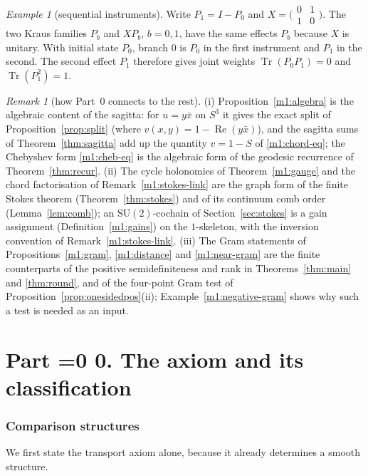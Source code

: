 \documentclass[11pt,reqno]{amsart}
\theoremstyle{definition}
\theoremstyle{remark}
\newtheorem{remark}[theorem]{Remark}
\newtheorem{example}[theorem]{Example}
\numberwithin{equation}{section}
\newcommand{\re}{\operatorname{Re}}
\newcommand{\SU}{\mathrm{SU}}
\newcounter{ppart}
\renewcommand{\theppart}{\ifnum\value{ppart}=0 0\else\Roman{ppart}\fi}
\newcommand{\paperpart}[2]{\refstepcounter{ppart}\part*{Part \theppart. #2}\label{#1}}
\begin{document}
\begin{example}[sequential instruments]\label{m1:sequential}
Write \(P_1=I-P_0\) and \(X=\bigl(\begin{smallmatrix}0&1\\1&0
\end{smallmatrix}\bigr)\). The two Kraus families \(P_b\) and
\(XP_b\), \(b=0,1\), have the same effects \(P_b\) because \(X\)
is unitary. With initial state \(P_0\), branch \(0\) is \(P_0\)
in the first instrument and \(P_1\) in the second. The second
effect \(P_1\) therefore gives joint weights
\(\operatorname{Tr}(P_0P_1)=0\) and
\(\operatorname{Tr}(P_1^2)=1\).
\end{example}

\begin{remark}[how Part~0 connects to the rest]\label{m1:links}
(i) Proposition~\ref{m1:algebra} is the algebraic content of the sagitta: for $u=y\bar x$ on $S^3$ it gives the exact split of
Proposition~\ref{prop:split} (where $v(x,y)=1-\re(y\bar x)$), and the sagitta sums of Theorem~\ref{thm:sagitta} add up the quantity $v=1-S$ of
\eqref{m1:chord-eq}; the Chebyshev form \eqref{m1:cheb-eq} is the algebraic form of the geodesic recurrence of
Theorem~\ref{thm:recur}.  (ii) The cycle holonomies of Theorem~\ref{m1:gauge} and the chord factorisation of
Remark~\ref{m1:stokes-link} are the graph form of the finite Stokes theorem (Theorem~\ref{thm:stokes}) and of its continuum comb
order (Lemma~\ref{lem:comb}); an $\SU(2)$-cochain of Section~\ref{sec:stokes} is a gain assignment (Definition~\ref{m1:gains}) on the
$1$-skeleton, with the inversion convention of Remark~\ref{m1:stokes-link}.  (iii) The Gram statements of Propositions~\ref{m1:gram}, \ref{m1:distance} and \ref{m1:near-gram} are
the finite counterparts of the positive semidefiniteness and rank in Theorems~\ref{thm:main} and \ref{thm:round}, and of the four-point
Gram test of Proposition~\ref{prop:onesidedpos}(ii); Example~\ref{m1:negative-gram} shows why such a test is needed as an input.
\end{remark}

\setcounter{section}{1}

\paperpart{part:axiom}{The axiom and its classification}

\section{Comparison structures}\label{sec:def}

We first state the transport axiom alone, because it already determines a smooth structure.
\end{document}
